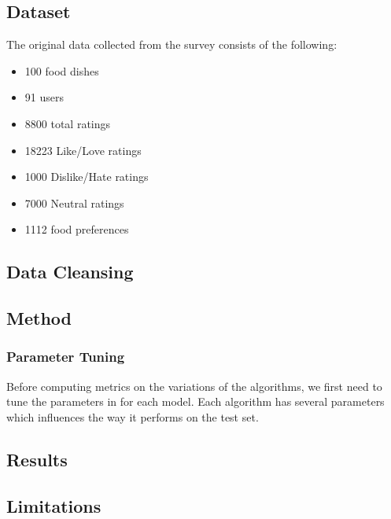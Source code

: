 \subsection{Dataset}
The original data collected from the survey consists of the following:
\begin{itemize}
	\item{100 food dishes}
	\item{91 users}
	\item{8800 total ratings}
	\item{18223 Like/Love ratings}
	\item{1000 Dislike/Hate ratings}
	\item{7000 Neutral ratings}
	\item{1112 food preferences}
\end{itemize}

\subsection{Data Cleansing}


\subsection{Method}
\subsubsection{Parameter Tuning}
Before computing metrics on the variations of the algorithms, we first need to tune the parameters in for each model. 
Each algorithm has several parameters which influences the way it performs on the test set. 

\subsection{Results}
\subsection{Limitations}



